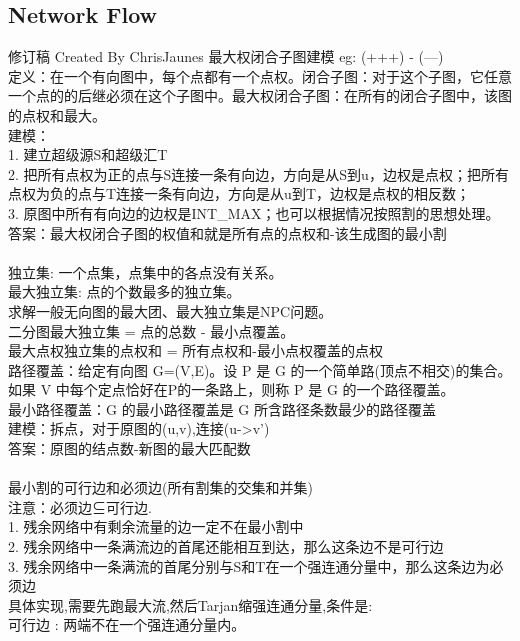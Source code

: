 \documentclass[10pt]{ctexart}
\begin{document}
{\subsection{Network Flow}
修订稿 Created By ChrisJaunes
最大权闭合子图建模 eg: (+++) - (---) \\
定义：在一个有向图中，每个点都有一个点权。闭合子图：对于这个子图，它任意一个点的的后继必须在这个子图中。最大权闭合子图：在所有的闭合子图中，该图的点权和最大。\\
建模：\\
1. 建立超级源S和超级汇T\\
2. 把所有点权为正的点与S连接一条有向边，方向是从S到u，边权是点权；把所有点权为负的点与T连接一条有向边，方向是从u到T，边权是点权的相反数；\\
3. 原图中所有有向边的边权是INT\_MAX；也可以根据情况按照割的思想处理。\\ 
答案：最大权闭合子图的权值和就是所有点的点权和-该生成图的最小割\\
\\
独立集: 一个点集，点集中的各点没有关系。\\
最大独立集: 点的个数最多的独立集。 \\
求解一般无向图的最大团、最大独立集是NPC问题。\\
二分图最大独立集 = 点的总数 - 最小点覆盖。\\
最大点权独立集的点权和 = 所有点权和-最小点权覆盖的点权\\
路径覆盖：给定有向图 G=(V,E)。设 P 是 G 的一个简单路(顶点不相交)的集合。如果 V 中每个定点恰好在P的一条路上，则称 P 是 G 的一个路径覆盖。\\
最小路径覆盖：G 的最小路径覆盖是 G 所含路径条数最少的路径覆盖\\
建模：拆点，对于原图的(u,v),连接(u->v')\\
答案：原图的结点数-新图的最大匹配数\\
\\
最小割的可行边和必须边(所有割集的交集和并集) \\
注意：必须边⊆可行边.\\
1. 残余网络中有剩余流量的边一定不在最小割中\\
2. 残余网络中一条满流边的首尾还能相互到达，那么这条边不是可行边\\
3. 残余网络中一条满流的首尾分别与S和T在一个强连通分量中，那么这条边为必须边\\
具体实现,需要先跑最大流,然后Tarjan缩强连通分量,条件是:\\
可行边 : 两端不在一个强连通分量内。\\
}
\end{document}
